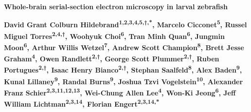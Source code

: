 \documentclass{article}
\begin{document}

\begin{center}
{\Large\bfseries Whole-brain serial-section electron microscopy in larval zebrafish}
\end{center}

\noindent\textbf{David Grant Colburn Hildebrand\textsuperscript{1,2,3,4,5,†,*}, Marcelo Cicconet\textsuperscript{5}, Russel Miguel Torres\textsuperscript{2,4,†}, Woohyuk Choi\textsuperscript{6}, Tran Minh Quan\textsuperscript{6}, Jungmin Moon\textsuperscript{6}, Arthur Willis Wetzel\textsuperscript{7}, Andrew Scott Champion\textsuperscript{8}, Brett Jesse Graham\textsuperscript{4}, Owen Randlett\textsuperscript{2,†}, George Scott Plummer\textsuperscript{2,†}, Ruben Portugues\textsuperscript{2,†}, Isaac Henry Bianco\textsuperscript{2,†}, Stephan Saalfeld\textsuperscript{8}, Alex Baden\textsuperscript{9}, Kunal Lillaney\textsuperscript{9}, Randal Burns\textsuperscript{9}, Joshua Tzvi Vogelstein\textsuperscript{10}, Alexander Franz Schier\textsuperscript{2,3,11,12,13}, Wei-Chung Allen Lee\textsuperscript{4}, Won-Ki Jeong\textsuperscript{6}, Jeff William Lichtman\textsuperscript{2,3,14}, Florian Engert\textsuperscript{2,3,14,*}}
\end{document}
